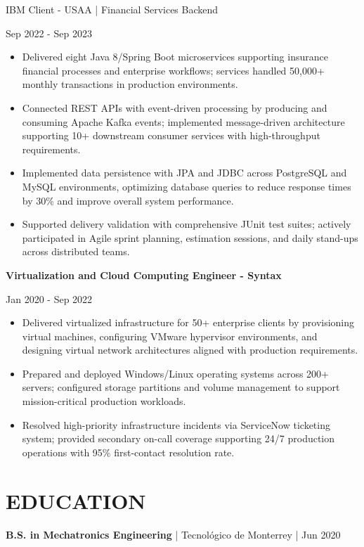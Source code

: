 \documentclass[10pt,a4paper]{article}
\newlength{\rolefontsize}
\newlength{\clientfontsize}
\newlength{\singlelinespacing}
\newlength{\singleseparation}
\newcommand{\role}[1]{
  \vspace{\singleseparation}
  {\fontsize{\rolefontsize}{\singlelinespacing} \selectfont \bfseries #1 \par}
  \nopagebreak}
\newcommand{\client}[1]{
  \vspace{\singleseparation}
  {\fontsize{\clientfontsize}{\singlelinespacing} \selectfont #1 \par} 
  \nopagebreak}
\newcommand{\education}[1]{
  \vspace{\singleseparation} 
  {\bfseries #1}}
\begin{document}
\client{IBM Client - USAA | Financial Services Backend}
Sep 2022 - Sep 2023 \par
\begin{itemize}
  \item Delivered eight Java 8/Spring Boot microservices supporting insurance financial processes and enterprise workflows; services handled 50,000+ monthly transactions in production environments.
  \item Connected REST APIs with event-driven processing by producing and consuming Apache Kafka events; implemented message-driven architecture supporting 10+ downstream consumer services with high-throughput requirements.
  \item Implemented data persistence with JPA and JDBC across PostgreSQL and MySQL environments, optimizing database queries to reduce response times by 30\% and improve overall system performance.
  \item Supported delivery validation with comprehensive JUnit test suites; actively participated in Agile sprint planning, estimation sessions, and daily stand-ups across distributed teams.
\end{itemize}

\newpage

\role{Virtualization and Cloud Computing Engineer - Syntax}
Jan 2020 - Sep 2022 \par
\begin{itemize}
  \item Delivered virtualized infrastructure for 50+ enterprise clients by provisioning virtual machines, configuring VMware hypervisor environments, and designing virtual network architectures aligned with production requirements.
  \item Prepared and deployed Windows/Linux operating systems across 200+ servers; configured storage partitions and volume management to support mission-critical production workloads.
  \item Resolved high-priority infrastructure incidents via ServiceNow ticketing system; provided secondary on-call coverage supporting 24/7 production operations with 95\% first-contact resolution rate.
\end{itemize}

\section*{EDUCATION}
\education{B.S. in Mechatronics Engineering} | Tecnológico de Monterrey | Jun 2020 \par
\end{document}
